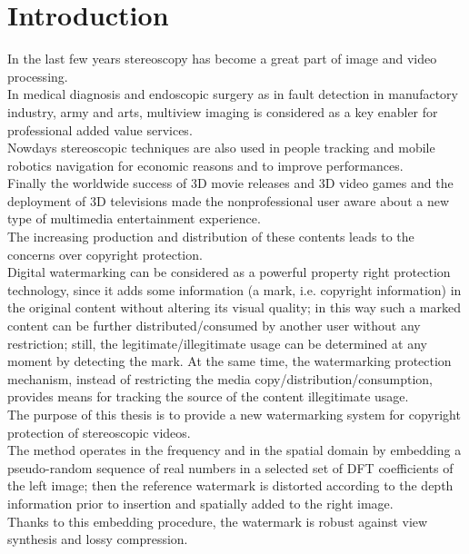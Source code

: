 \chapter*{Introduction}
\label{intro}
{}

In the last few years stereoscopy has become a great part of image and video processing.\\
In medical diagnosis and endoscopic surgery \cite{MED}\cite{MED2} as in fault detection in manufactory industry, army and arts,
multiview imaging is considered as a key enabler  for professional added value services.\\
Nowdays stereoscopic techniques are also used in people tracking \cite{TRACK} and mobile robotics
navigation \cite{PG} for economic reasons and to improve performances.\\
Finally the worldwide success of 3D movie releases and 3D video games \cite{GAME} and the deployment of 3D televisions made the nonprofessional user aware about a new type of multimedia entertainment experience.\\
The increasing production and distribution of these contents leads to the concerns over copyright protection.\\
Digital watermarking can be considered as a powerful property right protection technology, since it adds some information (a mark, i.e. copyright information) in the
original content without altering its visual quality; in this way such a marked content can be further distributed/consumed by another user without any restriction; still, the legitimate/illegitimate usage can be determined at any moment by detecting the mark. At the same time, the watermarking protection mechanism, instead of restricting the media copy/distribution/consumption, provides means for tracking the source of the content illegitimate usage.\\
The purpose of this thesis is to provide a new watermarking system for copyright protection of stereoscopic videos.\\
The method operates in the frequency and in the spatial domain by embedding a pseudo-random sequence of real numbers in a selected set of DFT coefficients of the left image; then the reference watermark is distorted according to the depth information prior to insertion and spatially added to the right image.\\
Thanks to this embedding procedure, the watermark is robust against view synthesis and lossy compression.

